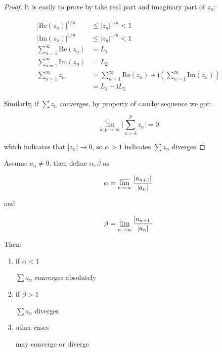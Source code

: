 \begin{proof}
    It is easily to prove by take real part and imaginary part of $z_n$:

    \begin{align*}
        \lvert \mathrm{Re}(z_n) \rvert ^{1/n} &\le \lvert z_n \rvert ^{1/n} < 1 \\
        \lvert \mathrm{Im}(z_n) \rvert ^{1/n} & \le \lvert z_n \rvert ^{1/n} < 1 \\
\sum_{n = 1}^{\infty}\mathrm{Re}(z_n) &= L_1 \\
\sum_{n = 1}^{\infty}\mathrm{Im}(z_n) &= L_2 \\
        \sum_{n = 1}^{\infty}z_n & = \sum_{n = 1}^{\infty}\mathrm{Re}(z_n) + \mathrm{i}\left(\sum_{n = 1}^{\infty}\mathrm{Im}(z_n) \right) \\
        &= L_1 + \mathrm{i}L_2
    \end{align*}

    Similarly, if $\sum z_n$ converges, by property of cauchy sequence we got:

    \[
        \lim_{k,p \to \infty}\lvert \sum_{n=k}^{p} z_n \rvert = 0
    \]

    which indicates that $\lvert z_n \rvert \to 0$, so $\alpha > 1$ indicates $\sum z_n$ diverges
\end{proof}

\begin{thm}
    \label{thm:thm-ratio-test}
   Assume $a_n \ne 0$, then define $\alpha, \beta$ as

   \[
        \alpha = \varlimsup_{n \to \infty}\frac{\lvert a_{n+1}\rvert}{\lvert a_{n} \rvert}
   \]

   and


   \[
        \beta = \varliminf_{n \to \infty}\frac{\lvert a_{n+1}\rvert}{\lvert a_{n} \rvert}
   \]

    Then:

    \begin{enumerate}
        \item if $\alpha < 1$

        $\sum a_n$ converges absolutely

        \item if $\beta > 1$

        $\sum a_n$ diverges


        \item other cases

        may converge or diverge
    \end{enumerate}
\end{thm}

